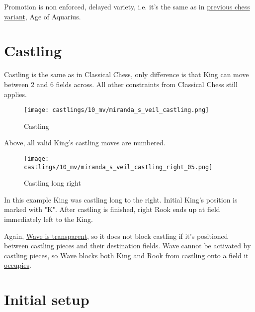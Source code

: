 Promotion is non enforced, delayed variety, i.e. it's the same as in
\hyperref[sec:Age of Aquarius/Promotion]{previous chess variant}, Age of Aquarius.

\clearpage %

\section*{Castling}
\label{sec:Miranda's veil/Castling}

Castling is the same as in Classical Chess, only difference is that King can move between 2 and 6 fields across.
All other constraints from Classical Chess still applies.

\vspace*{-0.7\baselineskip}
\noindent
\begin{figure}[!h]
\texttt{[image: castlings/10\_mv/miranda\_s\_veil\_castling.png]}
\caption{Castling}
\label{fig:miranda_s_veil_castling}
\end{figure}

Above, all valid King's castling moves are numbered.

\vspace*{-0.7\baselineskip}
\noindent
\begin{figure}[!h]
\texttt{[image: castlings/10\_mv/miranda\_s\_veil\_castling\_right\_05.png]}
\caption{Castling long right}
\label{fig:miranda_s_veil_castling_right_05}
\end{figure}

In this example King was castling long to the right. Initial King's position is marked with "K".
After castling is finished, right Rook ends up at field immediately left to the King.

Again, \hyperref[fig:scn_mv_07_wave_is_transparent]{Wave is transparent}, so it does
not block castling if it's positioned between castling pieces and their destination
fields.
Wave cannot be activated by castling pieces, so Wave blocks both King and Rook from castling
\hyperref[fig:scn_mv_11_wave_block_castling_rook]{onto a field it occupies}.

\clearpage %

\section*{Initial setup}
\label{sec:Miranda's veil/Initial setup}

